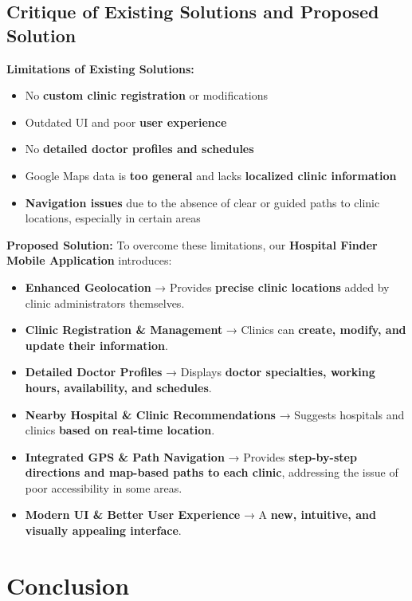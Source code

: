 \documentclass[12pt]{report}
\begin{document}
\subsection{\textbf{Critique of Existing Solutions and Proposed Solution}}

\textbf{Limitations of Existing Solutions:}
\begin{itemize}
	\item No \textbf{custom clinic registration} or modifications
	\item Outdated UI and poor \textbf{user experience}
	\item No \textbf{detailed doctor profiles and schedules}
	\item Google Maps data is \textbf{too general} and lacks \textbf{localized clinic information}
	\item \textbf{Navigation issues} due to the absence of clear or guided paths to clinic locations, especially in certain areas
\end{itemize}

\noindent \textbf{Proposed Solution:}
To overcome these limitations, our \textbf{Hospital Finder Mobile Application} introduces:
\begin{itemize}
	\item \textbf{Enhanced Geolocation} → Provides \textbf{precise clinic locations} added by clinic administrators themselves.
	\item \textbf{Clinic Registration \& Management} → Clinics can \textbf{create, modify, and update their information}.
	\item \textbf{Detailed Doctor Profiles} → Displays \textbf{doctor specialties, working hours, availability, and schedules}.
	\item \textbf{Nearby Hospital \& Clinic Recommendations} → Suggests hospitals and clinics \textbf{based on real-time location}.
	\item \textbf{Integrated GPS \& Path Navigation} → Provides \textbf{step-by-step directions and map-based paths to each clinic}, addressing the issue of poor accessibility in some areas.
	\item \textbf{Modern UI \& Better User Experience} → A \textbf{new, intuitive, and visually appealing interface}.
\end{itemize}

\section{\textbf{Conclusion}}
\end{document}
